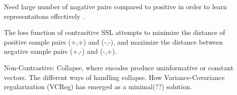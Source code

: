 \documentclass[../../thesis.tex]{subfiles}
\begin{document}
Need large number of nagative pairs compared to positive in order to learn representaitons effectively \cite{lee2024computer}.

The loss function of contrasitive SSL attempts to minimize the distance of positive sample pairs (+,+) and (-,-), and maximize the distance between negative sample pairs (+,-) and (-,+).\newline


Non-Contrastive: Collapse, where encodes produce uninformative or constant vectors. The different ways of handling collapse. How Variance-Covariance regularization (VCReg) \cite{mialon2024variance} has emerged as a minimal(??) solution. 












\end{document}
